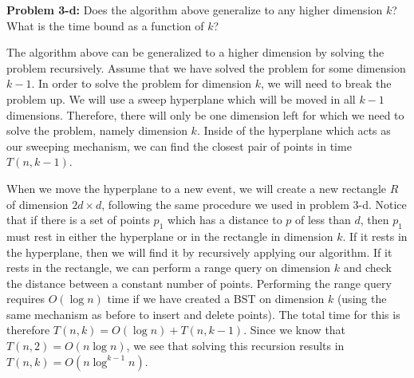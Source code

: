 \documentclass[psamsfonts]{amsart}
\newenvironment{sol}{\vspace{0.25cm}{\large \bfseries Solution:}}{\qedsymbol}
\newenvironment{prob}[1]{\begin{framed}{\large \bfseries Problem #1:}}{\end{framed}}
\begin{document}
\begin{prob}{3-d}
Does the algorithm above generalize to any higher dimension $k$? What is the time bound as a function of $k$?
\end{prob}
\begin{sol}
The algorithm above can be generalized to a higher dimension by solving the problem recursively. Assume that we have solved the problem for some dimension $k-1$. In order to solve the problem for dimension $k$, we will need to break the problem up. We will use a sweep hyperplane which will be moved in all $k-1$ dimensions. Therefore, there will only be one dimension left for which we need to solve the problem, namely dimension $k$. Inside of the hyperplane which acts as our sweeping mechanism, we can find the closest pair of points in time $T(n, k-1)$. 

When we move the hyperplane to a new event, we will create a new rectangle $R$ of dimension $2d \times d$, following the same procedure we used in problem 3-d. Notice that if there is a set of points $p_1$ which has a distance to $p$ of less than $d$, then $p_1$ must rest in either the hyperplane or in the rectangle in dimension $k$. If it rests in the hyperplane, then we will find it by recursively applying our algorithm. If it rests in the rectangle, we can perform a range query on dimension $k$ and check the distance between a constant number of points. Performing the range query requires $O(\log n)$ time if we have created a BST on dimension $k$ (using the same mechanism as before to insert and delete points). The total time for this is therefore $T(n, k) = O(\log n) + T(n, k-1)$. Since we know that $T(n, 2) = O(n \log n)$, we see that solving this recursion results in $T(n, k) = O(n \log^{k-1} n)$.  
\end{sol}
\end{document}
